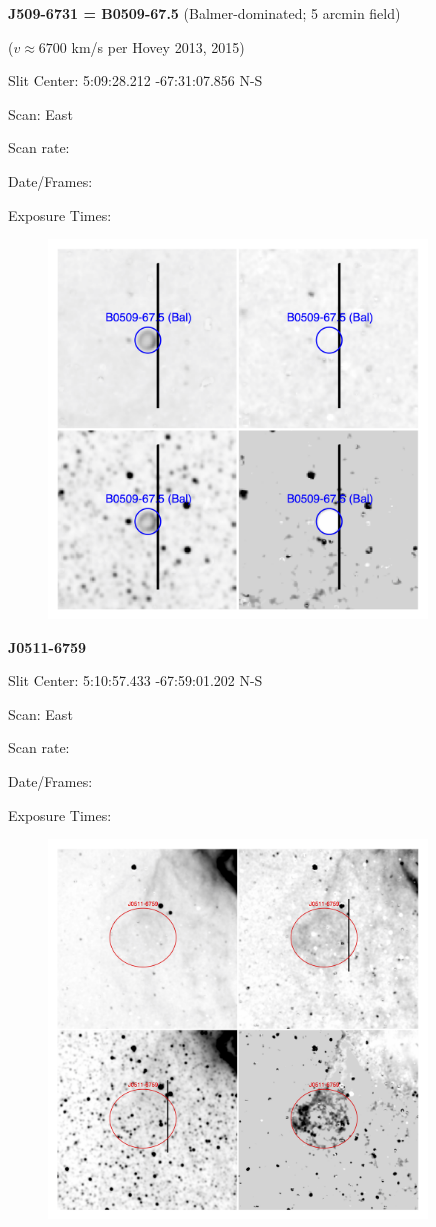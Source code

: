 \documentclass[11pt]{article}
\begin{document}
\newpage
{\bf J509-6731 = B0509-67.5}  (Balmer-dominated; 5 arcmin field)
 
 ($v \approx 6700$ km/s per Hovey 2013, 2015)
 
Slit Center:   5:09:28.212   -67:31:07.856     N-S  

Scan:  East

Scan rate:  

Date/Frames:

Exposure Times:  

\begin{figure}
\includegraphics[width=10.05cm]{snapshots/B0509-675_5arcmin.png}
\end{figure}

\newpage
{\bf J0511-6759}  
 
Slit Center:   5:10:57.433   -67:59:01.202     N-S 

Scan:  East

Scan rate:  

Date/Frames:

Exposure Times:  

\begin{figure}
\includegraphics[width=10.05cm]{snapshots/J0511-6759.png}
\end{figure}
\end{document}
